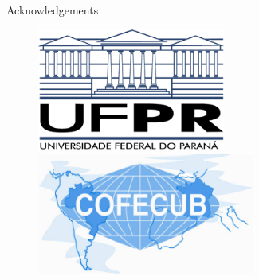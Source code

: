 \documentclass[final]{beamer}
\newlength{\colwidth}
\begin{document}
\begin{frame}[t]
\begin{columns}[t]
\begin{column}{\colwidth}
\begin{block}{Acknowledgements}
\begin{figure}
      \includegraphics[height = 4cm]{logos/ufpr.png}
      \includegraphics[height = 4cm]{cofecubp.jpg}
  \end{figure}
    
\end{block}

 

\end{column}
 


\end{columns}
\end{frame}
\end{document}
